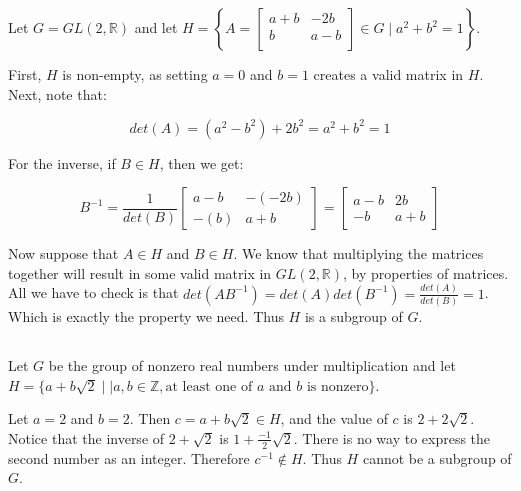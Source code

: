 \documentclass[a4paper,12pt]{article}
\begin{document}
\subsection{}

Let $G=GL(2, \mathbb{R})$ and let $H=\left\{A=\left[ \begin{array}{ccc} a+b & -2b \\ b & a-b \\ \end{array} \right] \in G \mid a^2 + b^2 =1 \right\}$.

First, $H$ is non-empty, as setting $a = 0$ and $b = 1$ creates a valid matrix in $H$. Next, note that:

\begin{equation*}
det(A) = (a^2 - b^2) + 2b^2 = a^2 + b^2 = 1
\end{equation*}

For the inverse, if $B \in H$, then we get:

\begin{equation*}
B^{-1} = \frac{1}{det(B)} \left[\begin{array}{cc}
a - b 	&		-(-2b) \\
 -(b)			&		a+b
\end{array}
\right] = \left[ \begin{array}{cc}
a - b 	&		2b \\
 -b			&		a+b
\end{array} \right]
\end{equation*}

Now suppose that $A \in H$ and $B \in H$. We know that multiplying the matrices together will result in some valid matrix in $GL(2, \mathbb{R})$, by properties of matrices. All we have to check is that $det(AB^{-1}) = det(A)det(B^{-1}) = \frac{det(A)}{det(B)} = 1$. Which is exactly the property we need. Thus $H$ is a subgroup of $G$.

\subsection{}

Let $G$ be the group of nonzero real numbers under multiplication and let $H = \{a+b\sqrt{2} \mid| a,b\in \mathbb{Z}, \text{at least one of $a$ and $b$ is nonzero}\}$.

Let $a = 2$ and $b = 2$. Then $c = a + b\sqrt{2} \in H$, and the value of $c$ is $2 + 2\sqrt{2}$. Notice that the inverse of $2 + \sqrt{2}$ is $1 + \frac{-1}{2} \sqrt{2}$. There is no way to express the second number as an integer. Therefore $c^{-1} \notin H$. Thus $H$ cannot be a subgroup of $G$.
\end{document}
